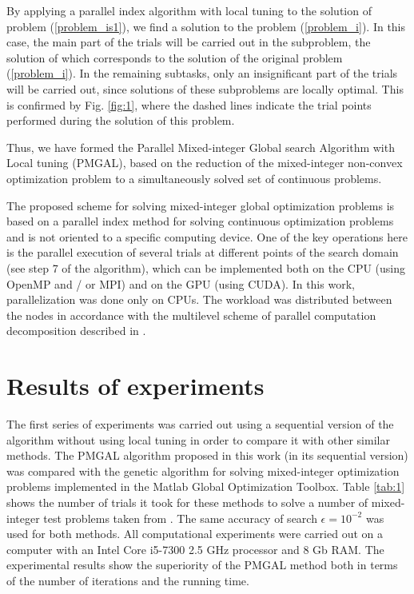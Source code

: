 \documentclass[
11pt,%
tightenlines,%
twoside,%
onecolumn,%
nofloats,%
nobibnotes,%
nofootinbib,%
superscriptaddress,%
noshowpacs,%
centertags]%
{revtex4}
\begin{document}
By applying a parallel index algorithm with local tuning to the solution of problem  (\ref{problem_is1}), we find a solution to the problem  (\ref{problem_i}). In this case, the main part of the trials will be carried out in the subproblem, the solution of which corresponds to the solution of the original problem (\ref{problem_i}). In the remaining subtasks, only an insignificant part of the trials will be carried out, since solutions of these subproblems are locally optimal. This is confirmed by Fig. \ref{fig:1}, where the dashed lines indicate the trial points performed during the solution of this problem.

Thus, we have formed the Parallel Mixed-integer Global search Algorithm with Local tuning (PMGAL), based on the reduction of the mixed-integer non-convex optimization problem to a simultaneously solved set of continuous problems.

The proposed scheme for solving mixed-integer global optimization problems is based on a parallel index method for solving continuous optimization problems and is not oriented to a specific computing device.  One of the key operations here is the parallel execution of several trials at different points of the search domain (see step 7 of the algorithm), which can be implemented both on the CPU (using OpenMP and / or MPI) and on the GPU (using CUDA). 
In this work, parallelization was done only on CPUs. The workload was distributed between the nodes in accordance with the multilevel scheme of parallel computation decomposition described in \cite{Strongin2018,Barkalov2020}.

\section{Results of experiments}

The first series of experiments was carried out using a sequential version of the algorithm without using local tuning in order to compare it with other similar methods.
The PMGAL algorithm proposed in this work (in its sequential version) was compared with the genetic algorithm for solving mixed-integer optimization problems implemented in the Matlab Global Optimization Toolbox. Table \ref{tab:1} shows the number of trials it took for these methods to solve a number of mixed-integer test problems taken from \cite{Deep,Floudas}. The same accuracy of search $\epsilon = 10^{-2}$ was used for both methods. All computational experiments were carried out on a computer with an Intel Core i5-7300 2.5 GHz processor and 8 Gb RAM. The experimental results show the superiority of the PMGAL method both in terms of the number of iterations and the running time.
\end{document}
